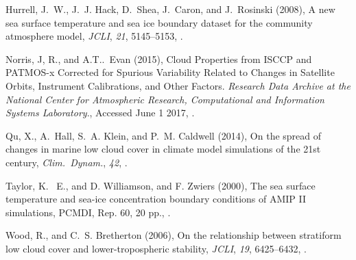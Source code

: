 \documentclass[draft,grl]{agutexSI}
\begin{document}
\begin{article}
\begin{thebibliography}{6}
Hurrell, J.~W., J.~J. Hack, D.~Shea, J.~Caron, and J.~Rosinski (2008), A new
  sea surface temperature and sea ice boundary dataset for the community
  atmosphere model, \textit{JCLI}, \textit{21}, 5145--5153,
  .

  
Norris, J, R., and A.T..~Evan (2015), Cloud Properties from ISCCP and PATMOS-x Corrected for Spurious Variability Related to Changes in Satellite Orbits, Instrument Calibrations, and Other Factors. \textit{Research Data Archive at the National Center for Atmospheric Research, Computational and Information Systems Laboratory}.,
Accessed June 1 2017,
.

Qu, X., A.~Hall, S.~A. Klein, and P.~M. Caldwell (2014), On the spread of
  changes in marine low cloud cover in climate model simulations of the 21st
  century, \textit{Clim.\ Dynam.}, \textit{42},
  .

Taylor, K. ~E., and D. Williamson, and F. Zwiers (2000), The sea
  surface temperature and sea-ice concentration boundary conditions
  of {AMIP} {II} simulations, {PCMDI}, Rep. 60, 20 pp., .  

Wood, R., and C.~S. Bretherton (2006), On the relationship between stratiform
  low cloud cover and lower-tropospheric stability, \textit{JCLI}, \textit{19},
  6425--6432, .


\end{thebibliography}
%
%
%



\end{article}
\end{document}
